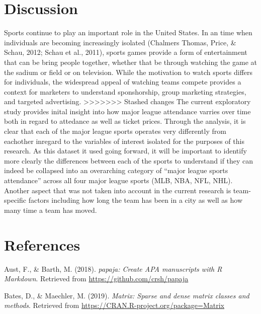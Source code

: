 \documentclass[man, fleqn, noextraspace,floatsintext]{apa6}
\begin{document}
\hypertarget{discussion-1}{%
\section{Discussion}\label{discussion-1}}

Sports continue to play an important role in the United States. In an time when individuals are becoming increasingly isolated (Chalmers Thomas, Price, \& Schau, 2012; Schau et al., 2011), sports games provide a form of entertainment that can be bring people together, whether that be through watching the game at the sadium or field or on television. While the motivation to watch sports differs for individuals, the widespread appeal of watching teams compete provides a context for marketers to understand sponshorship, group marketing strategies, and targeted advertising.
\textgreater{}\textgreater{}\textgreater{}\textgreater{}\textgreater{}\textgreater{}\textgreater{} Stashed changes
The current exploratory study provides inital insight into how major league attendance varries over time both in regard to attedance as well as ticket prices. Through the analysis, it is clear that each of the major league sports operates very differently from eachother inregard to the variables of interest isolated for the purposes of this research.
As this dataset it used going forward, it will be important to identify more clearly the differences between each of the sports to understand if they can indeed be collapsed into an overarching category of \enquote{major league sports attendance} across all four major league sports (MLB, NBA, NFL, NHL). Another aspect that was not taken into account in the current research is team-specific factors including how long the team has been in a city as well as how many time a team has moved.

\newpage

\hypertarget{references}{%
\section{References}\label{references}}

\begingroup
\setlength{\parindent}{-0.5in}
\setlength{\leftskip}{0.5in}

\hypertarget{refs}{}
\leavevmode\hypertarget{ref-R-papaja}{}%
Aust, F., \& Barth, M. (2018). \emph{papaja: Create APA manuscripts with R Markdown}. Retrieved from \url{https://github.com/crsh/papaja}

\leavevmode\hypertarget{ref-R-Matrix}{}%
Bates, D., \& Maechler, M. (2019). \emph{Matrix: Sparse and dense matrix classes and methods}. Retrieved from \url{https://CRAN.R-project.org/package=Matrix}
\end{document}
